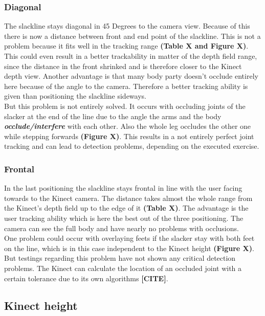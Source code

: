 \subsubsection{Diagonal}
The slackline stays diagonal in 45 Degrees to the camera view. Because of this there is now a distance between front and end point of the slackline. This is not a problem because it fits well in the tracking range \textbf{(Table X and Figure X)}. This could even result in a better trackability in matter of the depth field range, since the distance in the front shrinked and is therefore closer to the Kinect depth view. Another advantage is that many body party doesn't occlude entirely here because of the angle to the camera. Therefore a better tracking ability is given than positioning the slackline sideways.
\\
But this problem is not entirely solved. It occurs with occluding joints of the slacker at the end of the line due to the angle the arms and the body \textbf{\textit{occlude/interfere}} with each other. Also the whole leg occludes the other one while stepping forwards \textbf{(Figure X)}. This results in a not entirely perfect joint tracking and can lead to detection problems, depending on the executed exercise.

\subsubsection{Frontal}
In the last positioning the slackline stays frontal in line with the user facing towards to the Kinect camera. The distance takes almost the whole range from the Kinect’s depth field up to the edge of it \textbf{(Table X)}. The advantage is the user tracking ability which is here the best out of the three positioning. The camera can see the full body and have nearly no problems with occlusions.
\\
One problem could occur with overlaying feets if the slacker stay with both feet on the line, which is in this case independent to the Kinect height \textbf{(Figure X)}. But testings regarding this problem have not shown any critical detection problems. The Kinect can calculate the location of an occluded joint with a certain tolerance due to its own algorithms \textbf{[CITE]}.

\subsection{Kinect height}

